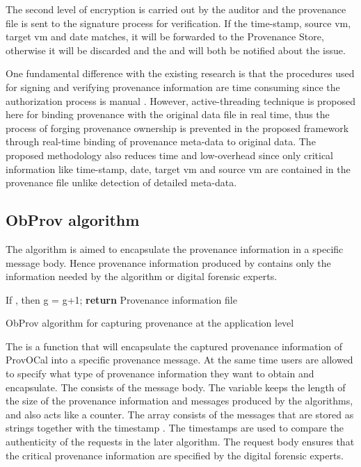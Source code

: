\documentclass[conference]{IEEEtran}
\begin{document}
The second level of encryption is carried out by the auditor and the provenance file is sent to the signature process for verification. If the time-stamp, source vm, target vm and date matches, it will be forwarded to the Provenance Store, otherwise it will be discarded and the  and  will both be notified about the issue.

One fundamental difference with the existing research is that the procedures used for signing and verifying provenance information are time consuming since the authorization process is manual \cite{zhang2012track}. However, active-threading technique is proposed here for binding provenance with the original data file in real time, thus the process of forging provenance ownership is prevented in the proposed framework through real-time binding of provenance meta-data to original data. The proposed methodology also reduces time and low-overhead since only critical information like time-stamp, date, target vm and source vm are contained in the provenance file unlike detection of detailed meta-data.


\subsection{ObProv algorithm}

The  algorithm is aimed to encapsulate the provenance information in a specific message body. Hence provenance information produced by  contains only the information needed by the  algorithm or digital forensic experts.

\begin{algorithm}
 \begin{algorithmic}[1]
 \State 
 \State 
 \State 
 \State 
 \State 
\While {}
 \State 
 \State 
 \State 
 \EndWhile
 \State If , then
 \State 
 \State g = g+1;
 \State \textbf{return} Provenance information file 
  \EndProcedure
 \end{algorithmic}
 \caption{ObProv algorithm for capturing provenance at the application level}
 \label{euclid}
\end{algorithm}

The  is a function that will encapsulate the captured provenance information of ProvOCal into a specific provenance message. At the same time users are allowed to specify what type of provenance information they want to obtain and encapsulate. The  consists of the message body. The variable  keeps the length of the size of the provenance information and messages produced by the algorithms, and also acts like a counter. The array  consists of the messages that are stored as strings together with the timestamp . The timestamps are used to compare the authenticity of the requests in the later algorithm. The request body  ensures that the critical provenance information are specified by the digital forensic experts.
\end{document}
